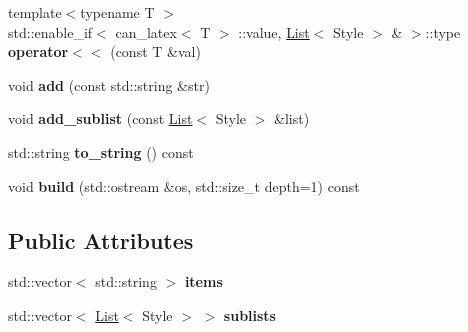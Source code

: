 \begin{DoxyCompactItemize}
\item 
\hypertarget{classlatex_1_1doc_1_1List_a68d596e7d17e04cfabbc06d80a954940}{{\footnotesize template$<$typename T $>$ }\\std\-::enable\-\_\-if$<$ can\-\_\-latex$<$ \-T $>$\*
\-::value, \hyperlink{classlatex_1_1doc_1_1List}{\-List}$<$ \-Style $>$\*
 \& $>$\-::type {\bfseries operator$<$$<$} (const \-T \&val)}\label{classlatex_1_1doc_1_1List_a68d596e7d17e04cfabbc06d80a954940}

\item 
\hypertarget{classlatex_1_1doc_1_1List_a04b52890de459bc6c6d0a6741b55bdf7}{void {\bfseries add} (const std\-::string \&str)}\label{classlatex_1_1doc_1_1List_a04b52890de459bc6c6d0a6741b55bdf7}

\item 
\hypertarget{classlatex_1_1doc_1_1List_a720d7827235c61d025ff66ed4723b0e9}{void {\bfseries add\-\_\-sublist} (const \hyperlink{classlatex_1_1doc_1_1List}{\-List}$<$ \-Style $>$ \&list)}\label{classlatex_1_1doc_1_1List_a720d7827235c61d025ff66ed4723b0e9}

\item 
\hypertarget{classlatex_1_1doc_1_1List_a5000125c08e3837c03f766f30a429cb1}{std\-::string {\bfseries to\-\_\-string} () const }\label{classlatex_1_1doc_1_1List_a5000125c08e3837c03f766f30a429cb1}

\item 
\hypertarget{classlatex_1_1doc_1_1List_a5ea2a813625fbeb5752ea66a12ac0a59}{void {\bfseries build} (std\-::ostream \&os, std\-::size\-\_\-t depth=1) const }\label{classlatex_1_1doc_1_1List_a5ea2a813625fbeb5752ea66a12ac0a59}

\end{DoxyCompactItemize}
\subsection*{\-Public \-Attributes}
\begin{DoxyCompactItemize}
\item 
\hypertarget{classlatex_1_1doc_1_1List_adacc628c072f9be831cab48615b8b564}{std\-::vector$<$ std\-::string $>$ {\bfseries items}}\label{classlatex_1_1doc_1_1List_adacc628c072f9be831cab48615b8b564}

\item 
\hypertarget{classlatex_1_1doc_1_1List_ac1ee0ddbd69ab8dfc46ae6f5fbdc21a1}{std\-::vector$<$ \hyperlink{classlatex_1_1doc_1_1List}{\-List}$<$ \-Style $>$ $>$ {\bfseries sublists}}\label{classlatex_1_1doc_1_1List_ac1ee0ddbd69ab8dfc46ae6f5fbdc21a1}

\end{DoxyCompactItemize}
